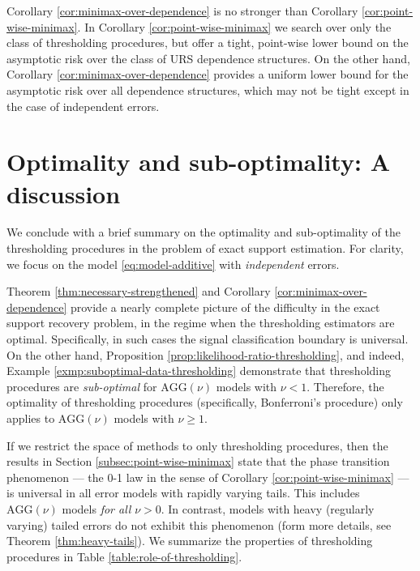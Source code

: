 \begin{remark}
Corollary \ref{cor:minimax-over-dependence} is no stronger than Corollary \ref{cor:point-wise-minimax}. 
In Corollary \ref{cor:point-wise-minimax} we search over only the class of thresholding procedures, but offer a tight, point-wise lower bound on the asymptotic risk over the class of URS dependence structures.
On the other hand, Corollary \ref{cor:minimax-over-dependence} provides a uniform lower bound for the asymptotic risk over all dependence structures, which may not be tight except in the case of independent errors.
\end{remark}




\section{Optimality and sub-optimality: A discussion}

We conclude with a brief summary on the optimality and sub-optimality of the thresholding procedures in the problem of exact support estimation.
For clarity, we focus on the model \eqref{eq:model-additive} with {\em independent} errors. 

Theorem \ref{thm:necessary-strengthened} and Corollary \ref{cor:minimax-over-dependence} provide a nearly complete picture of the difficulty 
in the exact support  recovery problem, in the regime when the thresholding estimators are optimal. Specifically, in such cases the signal classification boundary is universal.  On the other hand, Proposition \ref{prop:likelihood-ratio-thresholding}, and indeed, Example \ref{exmp:suboptimal-data-thresholding} demonstrate that thresholding procedures are \emph{sub-optimal} for $\text{AGG}(\nu)$ models with $\nu<1$. Therefore, the optimality of thresholding
procedures (specifically, Bonferroni's procedure) only applies to $\text{AGG}(\nu)$ models with $\nu\ge1$. 

If we restrict the space of methods to only thresholding procedures, then the results in Section \ref{subsec:point-wise-minimax} state that the phase 
transition phenomenon --- the 0-1 law in the sense of Corollary \ref{cor:point-wise-minimax} --- is universal in all error models with rapidly varying tails.
This includes $\text{AGG}(\nu)$ models {\it for all} $\nu>0$.  In contrast, models with heavy (regularly varying) tailed errors do not exhibit this phenomenon 
(form more details, see Theorem \ref{thm:heavy-tails}).  We summarize the properties of thresholding procedures in 
Table \ref{table:role-of-thresholding}. 

